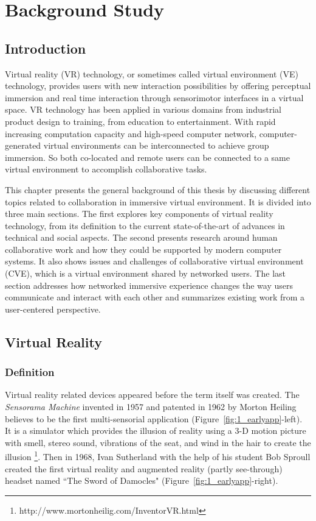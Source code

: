 \chapter{Background Study}
\label{chapter:context}
\pagebreak

\minitoc

\newpage
\section{Introduction}
Virtual reality (VR) technology, or sometimes called virtual environment (VE) technology, provides users with new interaction possibilities by offering perceptual immersion and real time interaction through sensorimotor interfaces in a virtual space. VR technology has been applied in various domains from industrial product design to training, from education to entertainment. With rapid increasing computation capacity and high-speed computer network, computer-generated virtual environments can be interconnected to achieve group immersion. So both co-located and remote users can be connected to a same virtual environment to accomplish collaborative tasks. 
 
This chapter presents the general background of this thesis by discussing different topics related to collaboration in immersive virtual environment. It is divided into three main sections. The first explores key components of virtual reality technology, from its definition to the current state-of-the-art of advances in technical and social aspects. The second presents research around human collaborative work and how they could be supported by modern computer systems. It also shows issues and challenges of collaborative virtual environment (CVE), which is a virtual environment shared by networked users. The last section addresses how networked immersive experience changes the way users communicate and interact with each other and summarizes existing work from a user-centered perspective.


\section{Virtual Reality}
\subsection{Definition}
Virtual reality related devices appeared before the term itself was created. The \textit{Sensorama Machine} invented in 1957 and patented in 1962 by Morton Heiling believes to be the first multi-sensorial application (Figure~\ref{fig:1_earlyapp}-left). It is a simulator which provides the illusion of reality using a 3-D motion picture with smell, stereo sound, vibrations of the seat, and wind in the hair to create the illusion \footnote{http://www.mortonheilig.com/InventorVR.html}. Then in 1968, Ivan Sutherland with the help of his student Bob Sproull created the first virtual reality and augmented reality (partly see-through) headset named ``The Sword of Damocles" \citep{Sutherland1968Hmd} (Figure~\ref{fig:1_earlyapp}-right).

